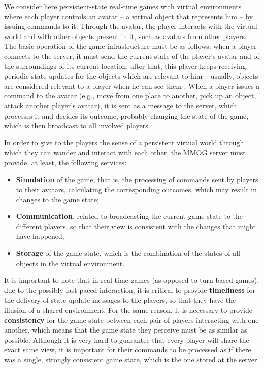 \documentclass[]{usiinfprospectus}
\begin{document}
We consider here persistent-state real-time games with virtual environments where each player controls an avatar -- a virtual object that represents him -- by issuing commands to it. Through the avatar, the player interacts with the virtual world and with other objects present in it, such as avatars from other players. The basic operation of the game infrastructure must be as follows: when a player connects to the server, it must send the current state of the player's avatar and of the surroundings of its current location; after that, this player keeps receiving periodic state updates for the objects which are relevant to him -- usually, objects are considered relevant to a player when he can see them \cite{bezerra2008a3,ahmed2008dai,minson2005aim}. When a player issues a command to the avatar (e.g., move from one place to another, pick up an object, attack another player's avatar), it is sent as a message to the server, which processes it and decides its outcome, probably changing the state of the game, which is then broadcast to all involved players.

In order to give to the players the sense of a persistent virtual world through which they can wander and interact with each other, the MMOG server must provide, at least, the following services:

\begin{itemize}
	\item \textbf{Simulation} of the game, that is, the processing of commands sent by players to their avatars, calculating the corresponding outcomes, which may result in changes to the game state;
	\item \textbf{Communication}, related to broadcasting the current game state to the different players, so that their view is consistent with the changes that might have happened;
	\item \textbf{Storage} of the game state, which is the combination of the states of all objects in the virtual environment.
\end{itemize}

It is important to note that in real-time games (as opposed to turn-based games), due to the possibly fast-paced interaction, it is critical to provide \textbf{timeliness} for the delivery of state update messages to the players, so that they have the illusion of a shared environment. For the same reason, it is necessary to provide \textbf{consistency} for the game state between each pair of players interacting with one another, which means that the game state they perceive must be as similar as possible. Although it is very hard to guarantee that every player will share the exact same view, it is important for their commands to be processed as if there was a single, strongly consistent game state, which is the one stored at the server. 
\end{document}
